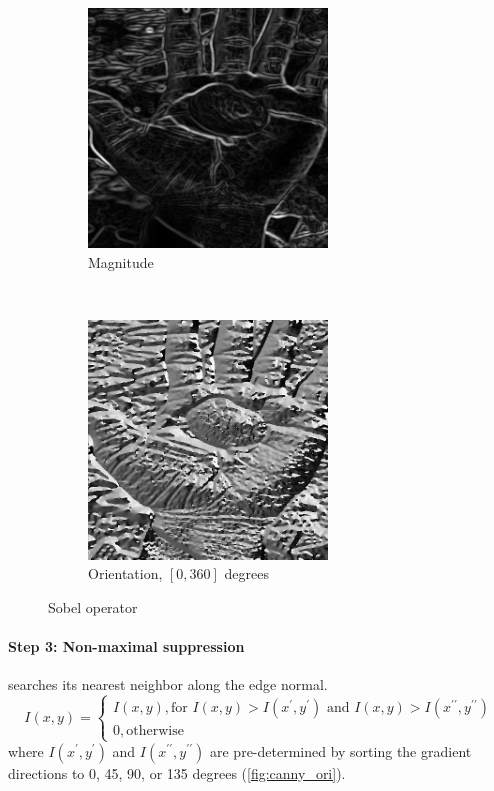 \documentclass[12pt]{article}
\begin{document}
\begin{figure}[H]
    \centering
    \begin{subfigure}[t]{0.5\textwidth}
        \centering
        \includegraphics[height=2.5in]{images/canny_sxy}
        \caption{Magnitude}
    \end{subfigure}%
    ~
    \begin{subfigure}[t]{0.5\textwidth}
        \centering
        \includegraphics[height=2.5in]{images/canny_sth}
        \caption{Orientation, $[0, 360]$ degrees}
    \end{subfigure}
    \caption{Sobel operator}
\end{figure}

\paragraph*{Step 3: Non-maximal suppression} searches its nearest neighbor along the edge normal.
\begin{equation}
	I(x, y) = \begin{cases}
		I(x, y), \text{for } I(x, y) > I(x^\prime, y^\prime) \text{ and } I(x, y) > I(x^{\prime\prime}, y^{\prime\prime})\\
		0, \text{otherwise}
	\end{cases}
\end{equation}
where $I(x^\prime, y^\prime)$ and $I(x^{\prime\prime}, y^{\prime\prime})$ are pre-determined by sorting the gradient directions to 0, 45, 90, or 135 degrees (\autoref{fig:canny_ori}).
\end{document}
